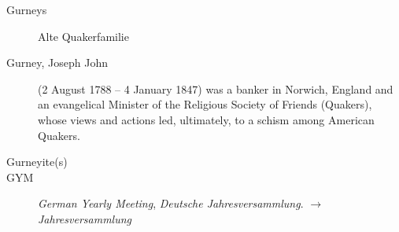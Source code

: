 \begin{description}
\item[Gurneys] Alte Quakerfamilie

\item[Gurney, Joseph John] (2 August 1788 – 4 January 1847) was a banker in Norwich, England and an evangelical Minister of the Religious Society of Friends (Quakers), whose views and actions led, ultimately, to a schism among American Quakers.

\item[Gurneyite(s)]

\item[GYM] \textit{German Yearly Meeting}, \textit{Deutsche Jahresversammlung}. $\to$\textit{Jahresversammlung}
 \end{description}

\normalsize